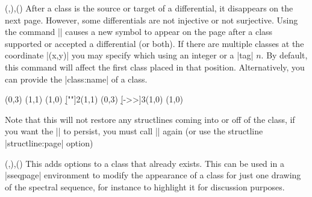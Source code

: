 \documentclass{ltxdoc}
\begin{document}
\begin{sseqdata}[name=ex1,degree={#1}{1-#1}]
\begin{commandlist}{{\replaceclass{}(,)},\replaceclass{}()}
After a class is the source or target of a differential, it disappears on the next page. However, some differentials are not injective or not surjective. Using the command |\replaceclass| causes a new symbol to appear on the page after a class supported or accepted a differential (or both). If there are multiple classes at the coordinate |(x,y)| you may specify which using an integer or a |tag| $n$. By default, this command will affect the first class placed in that position. Alternatively, you can provide the |class:name| of a class.
\begin{codeexample}[]
\begin{sseqdata}[name=replace class example,Adams grading,classes={draw=none},math nodes]
\class["\mathbb{Z}"](0,3)
\class["\mathbb{Z}"](1,1)
\class["\mathbb{Z}"](1,0)
\d[""]2(1,1)
\replaceclass["\mathbb{Z}/2"](0,3)
\d[->>]3(1,0)
\replaceclass["2\mathbb{Z}"](1,0)
\end{sseqdata}
\printpage[name=replace class example, page=2]
\hskip1cm
\printpage[name=replace class example, page=3]
\hskip1cm
\printpage[name=replace class example, page=4]
\end{codeexample}
Note that this will not restore any structlines coming into or off of the class, if you want the |\structlines| to persist, you must call |\structline| again (or use the structline |structline:page| option)
\end{commandlist}

\begin{commandlist}{{(,)},()}
This adds options to a class that already exists. This can be used in a |sseqpage| environment to modify the appearance of a class for just one drawing of the spectral sequence, for instance to highlight it for discussion purposes.


\end{commandlist}
\end{sseqdata}
\end{document}
